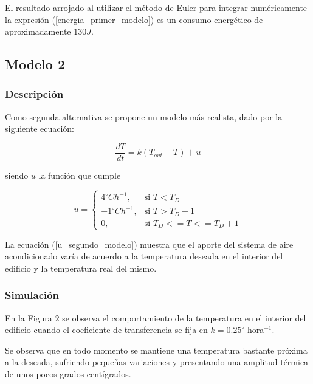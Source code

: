 \documentclass{sig-alternate}
\begin{document}
El resultado arrojado al utilizar el m\'{e}todo de Euler para integrar 
num\'{e}ricamente la expresi\'{o}n (\ref{energia_primer_modelo}) es un 
consumo energ\'{e}tico de aproximadamente $130J$.

\subsection{Modelo 2}

\subsubsection{Descripci\'{o}n}

Como segunda alternativa se propone un modelo m\'{a}s realista, dado por la
siguiente ecuaci\'{o}n:

\begin{equation}
\label{segundo_modelo}
\frac{dT}{dt} = k ( T_{out} - T ) + u
\end{equation}

siendo $u$ la funci\'{o}n que cumple

\begin{equation}
\label{u_segundo_modelo}
u =  \begin{cases} 4^{\circ} C h^{-1}, & \mbox{si }  T < T_{D} \\
-1^{\circ} C h^{-1}, & \mbox{si }  T > T_{D} + 1 \\
0, & \mbox{si }  T_{D} <= T <= T_{D}+1 \end{cases}
\end{equation}

La ecuaci\'{o}n (\ref{u_segundo_modelo}) muestra que el aporte del
sistema de aire acondicionado var\'{i}a de acuerdo a la temperatura
deseada en el interior del edificio y la temperatura real del mismo.

\subsubsection{Simulaci\'{o}n}

En la Figura $2$ se observa el comportamiento
de la temperatura en el interior del edificio cuando el coeficiente de transferencia
se fija en $k = 0.25^{\circ}$ hora$^{-1}$.

Se observa que en todo momento se mantiene una temperatura bastante pr\'{o}xima
a la deseada, sufriendo peque\~{n}as variaciones y presentando una amplitud
t\'{e}rmica de unos pocos grados cent\'{i}grados.
\end{document}
